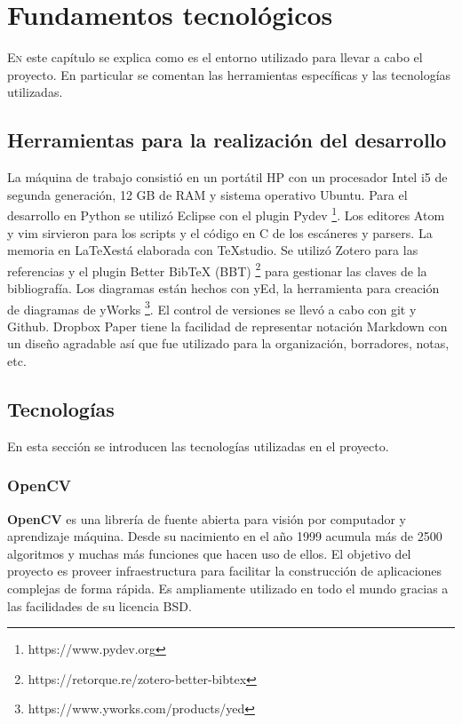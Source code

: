 
\chapter{Fundamentos tecnológicos}
\label{chap:fundamentos-tecnologicos}

\lettrine{E}n este capítulo se explica como es el entorno utilizado para llevar a cabo el proyecto. En particular se comentan las herramientas específicas y las tecnologías utilizadas.

\section{Herramientas para la realización del desarrollo}

La máquina de trabajo consistió en un portátil HP con un procesador Intel i5 de segunda generación, 12 GB de RAM y sistema operativo Ubuntu. Para el desarrollo en Python se utilizó Eclipse con el plugin Pydev
\footnote{https://www.pydev.org}. Los editores Atom y vim sirvieron para los scripts y el código en C de los escáneres y parsers. La memoria en \LaTeX está elaborada con TeXstudio. Se utilizó Zotero para las referencias y el plugin Better BibTeX (BBT) 
\footnote{https://retorque.re/zotero-better-bibtex} para gestionar las claves de la bibliografía. Los diagramas están hechos con yEd, la herramienta para creación de diagramas de yWorks 
\footnote{https://www.yworks.com/products/yed}. El control de versiones se llevó a cabo con git y Github. Dropbox Paper tiene la facilidad de representar notación Markdown con un diseño agradable así que fue utilizado para la organización, borradores, notas, etc.

\section{Tecnologías}

En esta sección se introducen las tecnologías utilizadas en el proyecto.

\subsection{OpenCV}

\textbf{OpenCV} \cite{opencvTeam_oficialSite_main} es una librería de fuente abierta para visión por computador y aprendizaje máquina. Desde su nacimiento en el año 1999 acumula más de 2500 algoritmos y muchas más funciones que hacen uso de ellos. El objetivo del proyecto es proveer infraestructura para facilitar la construcción de aplicaciones complejas de forma rápida. Es ampliamente utilizado en todo el mundo gracias a las facilidades de su licencia BSD. 

